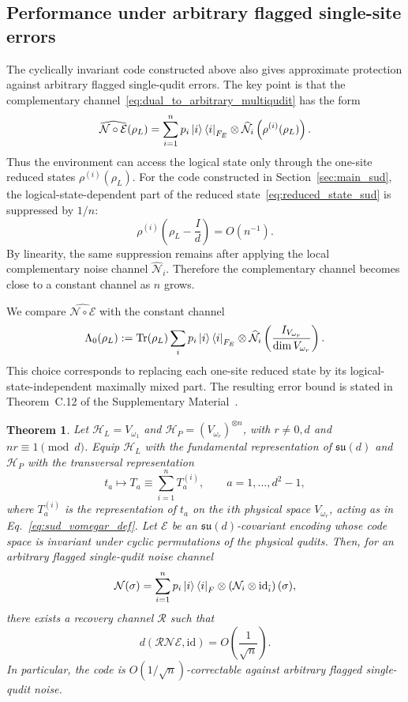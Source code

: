 \documentclass[10pt,twocolumn,superscriptaddress,aps,amsmath,amssymb,citeautoscript,floatfix,prx]{revtex4-2}
\newtheorem{theorem}{Theorem}
\theoremstyle{plain}
\theoremstyle{plain}
\theoremstyle{plain}
\theoremstyle{plain}
\theoremstyle{plain}
\theoremstyle{plain}
\begin{document}
\subsection{Performance under arbitrary flagged single-site errors}\label{subsec:main_arb_noise}

The cyclically invariant code constructed above also gives approximate protection against arbitrary flagged single-qudit errors. The key point is that the complementary channel~\eqref{eq:dual_to_arbitrary_multiqudit} has the form
$$
\widehat{\mathcal N\circ\mathcal E}(\rho_L)
=
\sum_{i=1}^n
p_i\ket i\bra i_{F_E}
\otimes
\widehat{\mathcal N}_i
\left(\rho^{(i)}(\rho_L)\right).
$$
Thus the environment can access the logical state only through the one-site reduced states $\rho^{(i)}(\rho_L)$. For the code constructed in Section~\ref{sec:main_sud}, the logical-state-dependent part of the reduced state~\eqref{eq:reduced_state_sud} is suppressed by $1/n$:
$$
\rho^{(i)}
\left(
\rho_L-\frac{I}{d}
\right)
=
O(n^{-1}) .
$$
By linearity, the same suppression remains after applying the local complementary noise channel $\widehat{\mathcal N}_i$. Therefore the complementary channel becomes close to a constant channel as $n$ grows.

We compare $\widehat{\mathcal N\circ\mathcal E}$ with the constant channel
$$
\Lambda_0(\rho_L)
:=
\operatorname{Tr}(\rho_L)
\sum_i
p_i\ket i\bra i_{F_E}
\otimes
\widehat{\mathcal N}_i
\left(
\frac{I_{V_{\omega_r}}}{\dim V_{\omega_r}}
\right).
$$
This choice corresponds to replacing each one-site reduced state by its logical-state-independent maximally mixed part. The resulting error bound is stated in Theorem~C.12 of the Supplementary Material~\cite{SuppMat}.

\begin{theorem}
Let $\mathcal H_L=V_{\omega_1}$ and $\mathcal H_P=(V_{\omega_r})^{\otimes n}$, with $r\neq 0,d$ and $nr\equiv 1\pmod d$. Equip $\mathcal H_L$ with the fundamental representation of $\mathfrak{su}(d)$ and $\mathcal H_P$ with the transversal representation
$$
t_a
\longmapsto
T_a
\equiv
\sum_{i=1}^n T_a^{(i)},
\qquad
a=1,\ldots,d^2-1,
$$
where $T_a^{(i)}$ is the representation of $t_a$ on the $i$th physical space $V_{\omega_r}$, acting as in Eq.~\eqref{eq:sud_vomegar_def}. Let $\mathcal E$ be an $\mathfrak{su}(d)$-covariant encoding whose code space is invariant under cyclic permutations of the physical qudits. Then, for an arbitrary flagged single-qudit noise channel
$$
\mathcal N(\sigma)
=
\sum_{i=1}^n
p_i\ket i\bra i_F
\otimes
\left(
\mathcal N_i\otimes\mathrm{id}_{\bar i}
\right)(\sigma),
$$
there exists a recovery channel $\mathcal R$ such that
$$
d(\mathcal R\mathcal N\mathcal E,\mathrm{id})
=
O\left(\frac{1}{\sqrt n}\right).
$$
In particular, the code is $O(1/\sqrt n)$-correctable against arbitrary flagged single-qudit noise.
\end{theorem}
\end{document}
